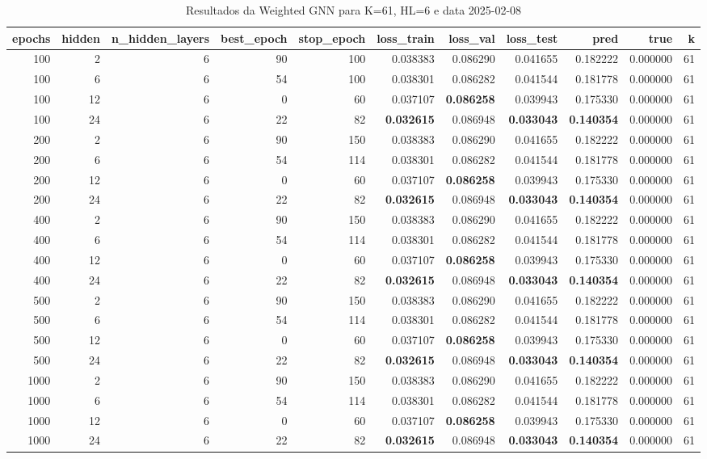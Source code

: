 \begin{table}
\caption{Resultados da Weighted GNN para K=61, HL=6 e data 2025-02-08}
\label{tab:weighted_gnn_results_k61_hl6_d20250208}
\begin{tabular}{rrrrrrrrrrr}
\toprule
epochs & hidden & n\_hidden\_layers & best\_epoch & stop\_epoch & loss\_train & loss\_val & loss\_test & pred & true & k \\
\midrule
100 & 2 & 6 & 90 & 100 & 0.038383 & 0.086290 & 0.041655 & 0.182222 & 0.000000 & 61 \\
100 & 6 & 6 & 54 & 100 & 0.038301 & 0.086282 & 0.041544 & 0.181778 & 0.000000 & 61 \\
100 & 12 & 6 & 0 & 60 & 0.037107 & \textbf{0.086258} & 0.039943 & 0.175330 & 0.000000 & 61 \\
100 & 24 & 6 & 22 & 82 & \textbf{0.032615} & 0.086948 & \textbf{0.033043} & \textbf{0.140354} & 0.000000 & 61 \\
200 & 2 & 6 & 90 & 150 & 0.038383 & 0.086290 & 0.041655 & 0.182222 & 0.000000 & 61 \\
200 & 6 & 6 & 54 & 114 & 0.038301 & 0.086282 & 0.041544 & 0.181778 & 0.000000 & 61 \\
200 & 12 & 6 & 0 & 60 & 0.037107 & \textbf{0.086258} & 0.039943 & 0.175330 & 0.000000 & 61 \\
200 & 24 & 6 & 22 & 82 & \textbf{0.032615} & 0.086948 & \textbf{0.033043} & \textbf{0.140354} & 0.000000 & 61 \\
400 & 2 & 6 & 90 & 150 & 0.038383 & 0.086290 & 0.041655 & 0.182222 & 0.000000 & 61 \\
400 & 6 & 6 & 54 & 114 & 0.038301 & 0.086282 & 0.041544 & 0.181778 & 0.000000 & 61 \\
400 & 12 & 6 & 0 & 60 & 0.037107 & \textbf{0.086258} & 0.039943 & 0.175330 & 0.000000 & 61 \\
400 & 24 & 6 & 22 & 82 & \textbf{0.032615} & 0.086948 & \textbf{0.033043} & \textbf{0.140354} & 0.000000 & 61 \\
500 & 2 & 6 & 90 & 150 & 0.038383 & 0.086290 & 0.041655 & 0.182222 & 0.000000 & 61 \\
500 & 6 & 6 & 54 & 114 & 0.038301 & 0.086282 & 0.041544 & 0.181778 & 0.000000 & 61 \\
500 & 12 & 6 & 0 & 60 & 0.037107 & \textbf{0.086258} & 0.039943 & 0.175330 & 0.000000 & 61 \\
500 & 24 & 6 & 22 & 82 & \textbf{0.032615} & 0.086948 & \textbf{0.033043} & \textbf{0.140354} & 0.000000 & 61 \\
1000 & 2 & 6 & 90 & 150 & 0.038383 & 0.086290 & 0.041655 & 0.182222 & 0.000000 & 61 \\
1000 & 6 & 6 & 54 & 114 & 0.038301 & 0.086282 & 0.041544 & 0.181778 & 0.000000 & 61 \\
1000 & 12 & 6 & 0 & 60 & 0.037107 & \textbf{0.086258} & 0.039943 & 0.175330 & 0.000000 & 61 \\
1000 & 24 & 6 & 22 & 82 & \textbf{0.032615} & 0.086948 & \textbf{0.033043} & \textbf{0.140354} & 0.000000 & 61 \\
\bottomrule
\end{tabular}
\end{table}

